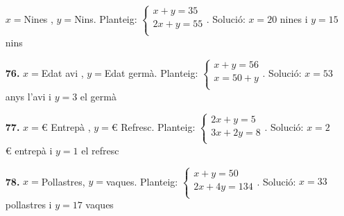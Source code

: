 \documentclass[a4paper, pdf, twoside]{book}
\begin{document}
\begin{multicols}{2}
\begin{enumerate}
$x=$Nines , $y=$Nins. Planteig: $\left \{\begin {array}{l} x+y=35\\ 2x+y=55\\ \end {array} \right .$. Solució: $x=20$ nines i $y=15$ nins 
\vspace{0.25cm}
\item[\fontfamily{phv}\selectfont\color{blue}\textbf{76. }] 
$x=$Edat avi , $y=$Edat germà. Planteig: $\left \{\begin {array}{l} x+y=56\\ x=50+y\\ \end {array} \right .$. Solució: $x=53$ anys l'avi i $y=3$ el germà 
\vspace{0.25cm}
\item[\fontfamily{phv}\selectfont\color{blue}\textbf{77. }] 
$x=$\euro {} Entrepà , $y=$\euro {} Refresc. Planteig: $\left \{\begin {array}{l} 2x+y=5\\ 3x+2y=8\\ \end {array} \right .$. Solució: $x=2$ \euro {} entrepà i $y=1$ el refresc
\vspace{0.25cm}
\item[\fontfamily{phv}\selectfont\color{blue}\textbf{78. }] 
$x=$Pollastres, $y=$vaques. Planteig: $\left \{\begin {array}{l} x+y=50\\ 2x+4y=134\\ \end {array} \right .$. Solució: $x=33$ pollastres i $y=17$ vaques
 \end{enumerate}
\vspace{0.3cm}



\end{multicols}
\end{document}
